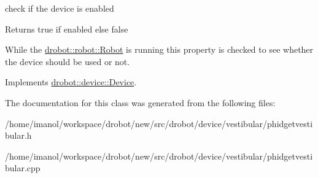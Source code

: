 check if the device is enabled 

\begin{DoxyReturn}{Returns}
true if enabled else false
\end{DoxyReturn}
While the \hyperlink{classdrobot_1_1robot_1_1Robot}{drobot\-::robot\-::\-Robot} is running this property is checked to see whether the device should be used or not. 

Implements \hyperlink{classdrobot_1_1device_1_1Device_aa5b7eac8638d0d2d5ee9bf10607b100e}{drobot\-::device\-::\-Device}.



The documentation for this class was generated from the following files\-:\begin{DoxyCompactItemize}
\item 
/home/imanol/workspace/drobot/new/src/drobot/device/vestibular/phidgetvestibular.\-h\item 
/home/imanol/workspace/drobot/new/src/drobot/device/vestibular/phidgetvestibular.\-cpp\end{DoxyCompactItemize}
